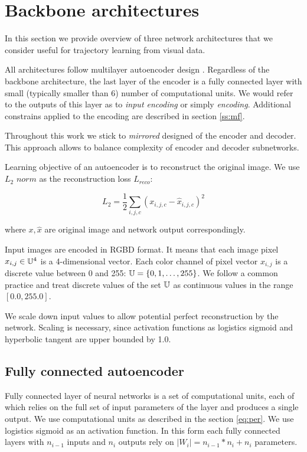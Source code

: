 \section{Backbone architectures}

In this section we provide overview of three network architectures that we consider useful for trajectory learning from visual data.

All architectures follow multilayer autoencoder design \cite{Hinton2006}.
Regardless of the backbone architecture, the last layer of the encoder is a fully connected layer with small (typically smaller than 6) number of computational units.
We would refer to the outputs of this layer as to  \textit{input encoding} or simply \textit{encoding}.
Additional constrains applied to the encoding are described in section \ref{ss:mf}.

Throughout this work we stick to \textit{mirrored} designed of the encoder and decoder.
This approach allows to balance complexity of encoder and decoder subnetworks.

Learning objective of an autoencoder is to reconstruct the original image.
We use $L_2$ $norm$ as the reconstruction loss $L_{reco}$:

\begin{equation}
  L_{2} = \frac{1}{2} \sum_{i, j, c} (x_{i,j,c} - \hat{x}_{i,j,c})^2
\end{equation}

where $x, \hat{x}$ are original image and network output correspondingly.

Input images are encoded in RGBD format. It means that each image pixel $x_{i,j} \in \Bbb{U}^4$ is a 4-dimensional vector.
Each color channel of pixel vector $x_{i,j}$ is a discrete value between 0 and 255: $\Bbb{U} = \{0, 1, \ldots, 255 \}$.
We follow a common practice and treat discrete values of the set $\Bbb{U}$ as continuous values in the range $[0.0, 255.0]$.

We scale down input values to allow potential perfect reconstruction by the network.
Scaling is necessary, since activation functions as logistics sigmoid and hyperbolic tangent are upper bounded by 1.0.


\subsection{Fully connected autoencoder}

Fully connected layer of neural networks is a set of computational units, each of which relies on the full set of input parameters of the layer and produces a single output.
We use computational units as described in the section \ref{eq:per}.
We use logistics sigmoid as an activation function.
In this form each fully connected layers with $n_{i-1}$ inputs and $n_i$ outputs rely on $|W_i|=n_{i-1}*n_i+n_i$ parameters.

